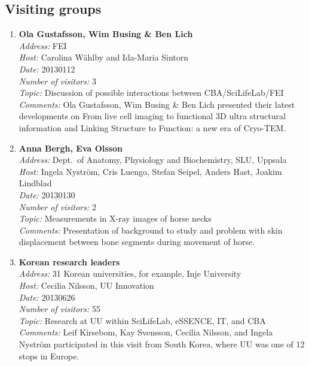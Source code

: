 \subsection{Visiting groups}
\begin{enumerate}
\item
{\bf Ola Gustafsson, Wim Busing \& Ben Lich}~\\
{\em Address:} FEI~\\
{\em Host:} Carolina W\"{a}hlby and Ida-Maria Sintorn~\\
{\em Date:} 20130112~\\
{\em Number of visitors:} 3~\\
{\em Topic:} Discussion of possible interactions between CBA/SciLifeLab/FEI~\\
{\em Comments:} Ola Gustafsson, Wim Busing \& Ben Lich presented their latest developments on From live cell imaging to functional 3D ultra structural information and Linking Structure to Function: a new era of Cryo-TEM.

\item
{\bf Anna Bergh, Eva Olsson}~\\
{\em Address:} Dept.~of Anatomy, Physiology and Biochemistry, SLU, Uppsala~\\
{\em Host:} Ingela Nystr\"{o}m, Cris Luengo, Stefan Seipel, Anders Hast, Joakim Lindblad~\\
{\em Date:} 20130130~\\
{\em Number of visitors:} 2~\\
{\em Topic:} Measurements in X-ray images of horse necks~\\
{\em Comments:} Presentation of background to study and problem with skin displacement between bone segments during movement of horse.

\item 
{\bf Korean research leaders}~\\
{\em Address:} 31 Korean universities, for example, Inje University~\\
{\em Host:} Cecilia Nilsson, UU Innovation~\\
{\em Date:} 20130626~\\
{\em Number of visitors:} 55~\\
{\em Topic:} Research at UU within SciLifeLab, eSSENCE, IT, and CBA~\\
{\em Comments:} Leif Kirsebom, Kay Svensson, Cecilia Nilsson, and Ingela Nystr\"{o}m participated in this visit from South Korea, where UU was one of 12 stops in Europe.


\end{enumerate}
